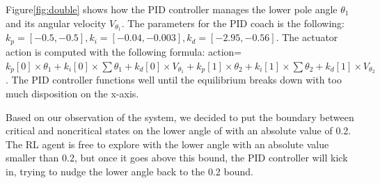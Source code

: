 \documentclass{IJCAS}
\begin{document}
Figure\ref{fig:double} shows how the PID controller manages the lower pole angle $\theta_1$ and its angular velocity $V_{\theta_1}$. The parameters for the PID coach is the following: $k_p=[-0.5,-0.5], k_i=[-0.04,-0.003], k_d=[-2.95,-0.56]$. The actuator action is computed with the following formula: action=$k_p[0]\times \theta_1+k_i[0]\times \sum{\theta_1}+k_d[0]\times V_{\theta_1}+k_p[1]\times \theta_2+k_i[1]\times \sum{\theta_2}+k_d[1]\times V_{\theta_2}$. The PID controller functions well until the equilibrium breaks down with too much disposition on the x-axis.

Based on our observation of the system, we decided to put the boundary between critical and noncritical states on the lower angle of with an absolute value of 0.2. The RL agent is free to explore with the lower angle with an absolute value smaller than 0.2, but once it goes above this bound, the PID controller will kick in, trying to nudge the lower angle back to the 0.2 bound.
\end{document}
